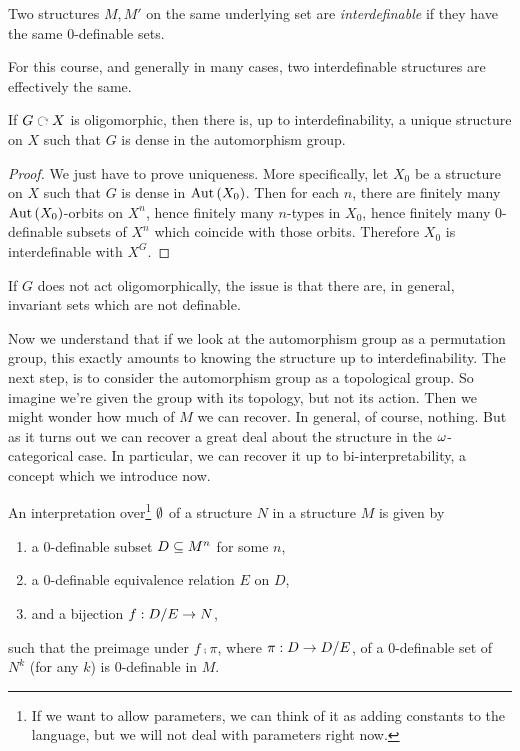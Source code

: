 \documentclass{amsart}
\begin{document}
\begin{defn}
Two structures $M , M'$ on the same
underlying set are \emph{interdefinable}
if they have the same $0$-definable sets.
\end{defn}

\begin{rmk}
For this course, and generally in many cases, two interdefinable structures
are effectively the same.
\end{rmk}

\begin{prop}
If $G\acts X$ is oligomorphic, then there is,
up to interdefinability, a unique structure on $X$ such that
$G$ is dense in the automorphism group.
\end{prop}

\begin{proof}
We just have to prove uniqueness.
More specifically, let $X_0$ be a structure on $X$ such that
$G$ is dense in $\operatorname{Aut}\left( X_0 \right)$. 
Then for each $n$, there are finitely many 
$\operatorname{Aut}\left( X_0 \right)$-orbits on $X^n$, hence finitely many
$n$-types in $X_0$, hence finitely many $0$-definable subsets of $X^n$
which coincide with those orbits.
Therefore $X_0$ is interdefinable with $X^G$.
\end{proof}

If $G$ does not act oligomorphically, the issue is that
there are, in general, invariant sets which are not definable.

Now we understand that if we look at the automorphism group as a permutation group,
this exactly amounts to knowing the structure up to interdefinability.
The next step, is to consider the automorphism group as a topological group.
So imagine we're given the group with its topology, but not its action.
Then we might wonder how much of $M$ we can recover.
In general, of course, nothing. But as it turns out
we can recover a great deal about the structure in the $\omega$-categorical case.
In particular, we can recover it up to bi-interpretability,
a concept which we introduce now.

\begin{defn}
An interpretation over\footnote{If we want to allow parameters, we can think of it as adding constants
to the language, but we will not deal with parameters right now.}
$\emptyset$ of a structure $N$ in a structure $M$ is given by 
\begin{enumerate}
\item a $0$-definable subset $D\subseteq M^n$ for some $n$, 
\item a $0$-definable equivalence relation $E$ on $D$,
\item and a bijection $f: D / E \rightarrow N$, 
\end{enumerate}
such that the preimage under $f\comp \pi$, where $\pi: D\rightarrow D /E$,
of a $0$-definable set of $N^k$ (for any $k$) is $0$-definable in $M$.
\end{defn}
\end{document}
